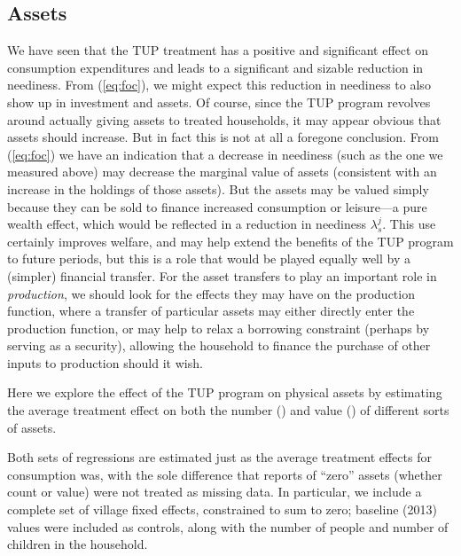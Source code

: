 \documentclass[12pt,letterpaper]{article}
\newcommand{\Eq}[1]{(\ref{eq:#1})}
\begin{document}
\subsection{Assets}
\label{sec:orgheadline16}

We have seen that the TUP treatment has a positive and significant
effect on consumption expenditures and leads to a significant and
sizable reduction in neediness.  From \Eq{foc}, we might expect this
reduction in neediness to also show up in investment and assets.  Of
course, since the TUP program revolves around actually giving assets
to treated households, it may appear obvious that assets should
increase.  But in fact this is not at all a foregone conclusion.  From
\Eq{foc} we have an indication that a decrease in neediness (such as
the one we measured above) may decrease the marginal value of assets
(consistent with an increase in the holdings of those assets).  But
the assets may be valued simply because they can be sold to finance
increased consumption or leisure---a pure wealth effect, which would
be reflected in a reduction in neediness \(\lambda^j_s\).  This use
certainly improves welfare, and may help extend the benefits of the
TUP program to future periods, but this is a role that would be played
equally well by a (simpler) financial transfer.  For the asset
transfers to play an important role in \emph{production}, we should look
for the effects they may have on the production function, where a
transfer of particular assets may either directly enter the production
function, or may help to relax a borrowing constraint (perhaps by
serving as a security), allowing the household to finance the purchase
of other inputs to production should it wish.

Here we explore the effect of the TUP program on physical assets by
estimating the average treatment effect on both the number
() and value () of
different sorts of assets.

Both sets of regressions are estimated just as the average treatment
effects for consumption was, with the sole difference that reports of
``zero'' assets (whether count or value) were not treated as missing
data.  In particular, we include a complete set of village fixed
effects, constrained to sum to zero; baseline (2013) values were
included as controls, along with the number of people and number of
children in the household.
\end{document}

